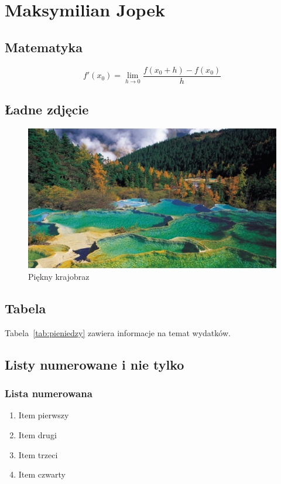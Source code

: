 \section{Maksymilian Jopek}

\subsection{Matematyka}
\begin{equation}
    f'(x_0) = \lim_{h \to 0}\frac{f(x_0 + h) - f(x_0)}{h}
\end{equation}

\subsection{Ładne zdjęcie}
\begin{figure}[htbp]
    \begin{center}
    \includegraphics[scale=.15]{pictures/MJzdj.png}
    \caption{Piękny krajobraz}
    \label{fig:a}
    \end{center}
\end{figure}

\subsection{Tabela}
Tabela~\ref{tab:pieniedzy} zawiera informacje na temat wydatków.


\newpage
\subsection{Listy numerowane i nie tylko}

\subsubsection{Lista numerowana}
\begin{enumerate}
  \item Item pierwszy
  \item Item drugi
  \item Item trzeci
  \item Item czwarty
\end{enumerate}

